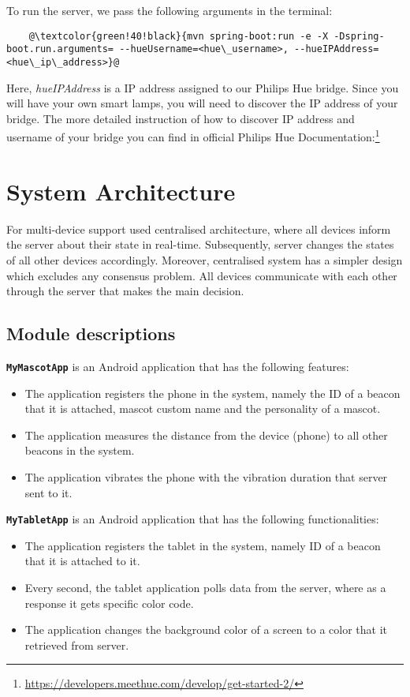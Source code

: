 To run the server, we pass the following arguments in the terminal:
\begin{lstlisting}
    @\textcolor{green!40!black}{mvn spring-boot:run -e -X -Dspring-boot.run.arguments= --hueUsername=<hue\_username>, --hueIPAddress=<hue\_ip\_address>}@
\end{lstlisting}

Here, \emph{hueIPAddress} is a IP address assigned to our Philips Hue bridge.
Since you will have your own smart lamps, you will need to discover the IP address of your bridge.
The more detailed instruction of how to discover IP address and username of your bridge you can
find in official Philips Hue Documentation:\footnote{\url{https://developers.meethue.com/develop/get-started-2/}}

\section{System Architecture}
\label{sec:system-architecture}
For multi-device support used centralised architecture, where all devices inform the server about their state in real-time.
Subsequently, server changes the states of all other devices accordingly.
Moreover, centralised system has a simpler design which excludes any consensus problem.
All devices communicate with each other through the server that makes the main decision.

\subsection{Module descriptions}
\label{subsec:module-descriptions}
\textbf{\texttt{MyMascotApp}} is an Android application that has the following features:
\begin{itemize}
    \item The application registers the phone in the system, namely the ID of a beacon that it is attached,
    mascot custom name and the personality of a mascot.
    \item The application measures the distance from the device (phone) to all other beacons in the system.
    \item The application vibrates the phone with the vibration duration that server sent to it.
\end{itemize}

\textbf{\texttt{MyTabletApp}} is an Android application that has the following functionalities:
\begin{itemize}
    \item The application registers the tablet in the system, namely ID of a beacon that it is attached to it.
    \item Every second, the tablet application polls data from the server, where as a response it gets specific color code.
    \item The application changes the background color of a screen to a color that it retrieved from server.
\end{itemize}

